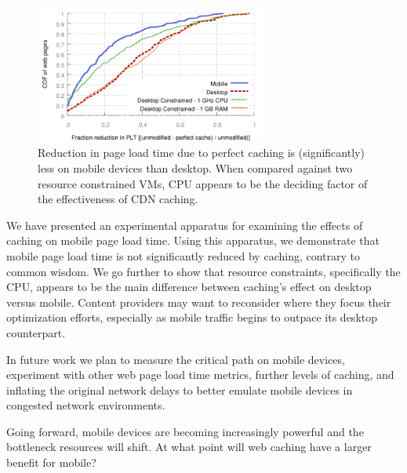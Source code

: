 
\begin{figure}[t]
    \includegraphics[width=3in]{../graphs/percent_plt_reduction/percent_reduction_linear.pdf}
    \caption[]{\label{fig:percent_reduction_linear}Reduction in page load time due to perfect caching is (significantly) less on mobile devices than desktop. When compared against two resource constrained VMs, CPU appears to be the deciding factor of the effectiveness of CDN caching.}
\end{figure}
We have presented an experimental apparatus for examining the effects of caching on mobile page load time.
Using this apparatus, we demonstrate that mobile page load time is not significantly reduced by caching, contrary to common wisdom.
We go further to show that resource constraints, specifically the CPU, appears to be the main difference between caching's effect on desktop versus mobile.
Content providers may want to reconsider where they focus their optimization efforts, especially as mobile traffic begins to outpace its desktop counterpart.

In future work we plan to measure the critical path on mobile devices, experiment with other web page load time metrics, further levels of caching, and inflating the original network delays to better emulate mobile devices in congested network environments. 

Going forward, mobile devices are becoming increasingly powerful and the bottleneck resources will shift. At what point will web caching have a larger benefit for mobile?  



